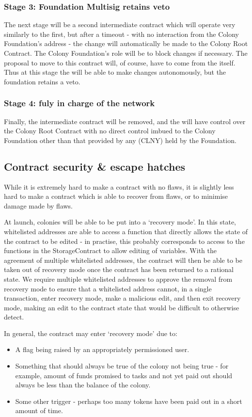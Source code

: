 \subsubsection*{Stage 3: Foundation Multisig retains veto}
The next stage will be a second intermediate contract which will operate very similarly to the first, but after a timeout - with no interaction from the Colony Foundation's address - the change will automatically be made to the Colony Root Contract. The Colony Foundation's role will be to block changes if necessary. The proposal to move to this contract will, of course, have to come from the \rc itself.  Thus at this stage the \rc will be able to make changes autonomously, but the foundation retains a veto.

\subsubsection*{Stage 4: \rc fuly in charge of the network}
Finally, the intermediate contract will be removed, and the \rc will have control over the Colony Root Contract with no direct control imbued to the Colony Foundation other than that provided by any \rct (CLNY) held by the Foundation. 

\subsection{Contract security \& escape hatches}
While it is extremely hard to make a contract with no flaws, it is slightly less hard to make a contract which is able to recover from flaws, or to minimise damage made by flaws.

At launch, colonies will be able to be put into a `recovery mode'. In this state, whitelisted addresses are able to access a function that directly allows the state of the contract to be edited - in practise, this probably corresponds to access to the functions in the StorageContract to allow editing of variables. With the agreement of multiple whitelisted addresses, the contract will then be able to be taken out of recovery mode once the contract has been returned to a rational state. We require multiple whitelisted addresses to approve the removal from recovery mode to ensure that a whitelisted address cannot, in a single transaction, enter recovery mode, make a malicious edit, and then exit recovery mode, making an edit to the contract state that would be difficult to otherwise detect.

In general, the contract may enter `recovery mode' due to:
\begin{itemize}
 \item A flag being raised by an appropriately permissioned user.
 \item Something that should always be true of the colony not being true - for example, amount of funds promised to tasks and not yet paid out should always be less than the balance of the colony.
 \item Some other trigger - perhaps too many tokens have been paid out in a short amount of time.
\end{itemize}

